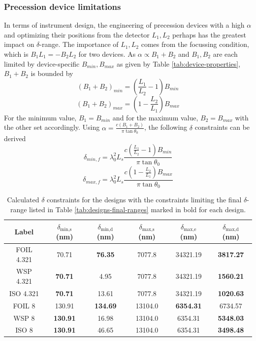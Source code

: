 \documentclass{article}
\begin{document}
\subsubsection{Precession device limitations}
In terms of instrument design, the engineering of precession devices with a high $\alpha$ and optimizing their positions from the detector $L_1, L_2$ perhaps has the greatest impact on $\delta$-range. The importance of $L_1, L_2$ comes from the focussing condition, which is $B_1L_1 = -B_2L_2$ for two devices. As $\alpha\propto B_1 + B_2$ and $B_1, B_2$ are each limited by device-specific $B_{min}, B_{max}$ as given by Table \ref{tab:device-properties}, $B_1 + B_2$ is bounded by
$$(B_1 + B_2)_{min} = (\frac{L_1}{L_2} - 1)B_{min}$$
$$(B_1 + B_2)_{max} = (1 - \frac{L_2}{L_1})B_{max}$$
For the minimum value, $B_1 = B_{min}$ and for the maximum value, $B_2 = B_{max}$ with the other set accordingly. Using $\alpha = \frac{c(B_1+B_2)}{\pi\tan\theta_0}$, the following $\delta$ constraints can be derived
$$\delta_{min, f} = \lambda_0^2 L_s \frac{c(\frac{L_1}{L_2} - 1)B_{min}}{\pi\tan\theta_0}$$
$$\delta_{max, f} = \lambda_0^2 L_s \frac{c(1 - \frac{L_2}{L_1})B_{max}}{\pi\tan\theta_0}$$

\begin{table}[h!]
	\centering
	\begin{tabular}{c | c c | c c c}
		\toprule
		Label & $\delta_{\text{min,s}}$ (nm) & $\delta_{\text{min,d}}$ (nm) & $\delta_{\text{max,s}}$ (nm) & $\delta_{\text{max,e}}$ (nm) & $\delta_{\text{max,d}}$ (nm) \\
		\midrule
		FOIL 4.321 & 70.71 & \textbf{76.35} & 7077.8 & 34321.19 & \textbf{3817.27} \\
		WSP 4.321 & \textbf{70.71} & 4.95 & 7077.8 & 34321.19 & \textbf{1560.21} \\
		ISO 4.321 & \textbf{70.71} & 13.61 & 7077.8 & 34321.19 & \textbf{1020.63} \\
		FOIL 8 & 130.91 & \textbf{134.69} & 13104.0 & \textbf{6354.31} & 6734.57 \\
		WSP 8 & \textbf{130.91} & 16.98 & 13104.0 & 6354.31 & \textbf{5348.03} \\
		ISO 8 & \textbf{130.91} & 46.65 & 13104.0 & 6354.31 & \textbf{3498.48} \\
		\bottomrule
	\end{tabular}
	\caption{Calculated $\delta$ constraints for the designs with the constraints limiting the final $\delta$-range listed in Table \ref{tab:designs-final-ranges} marked in bold for each design.}
	\label{tab:designs-delta-constraints}
\end{table}
\end{document}
